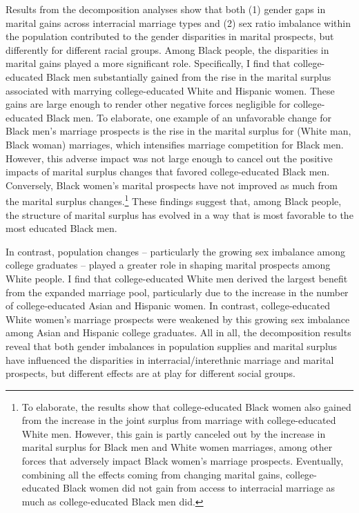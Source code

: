 Results from the decomposition analyses show that both (1) gender gaps in marital gains across interracial marriage types and (2) sex ratio imbalance within the population contributed to the gender disparities in marital prospects, but differently for different racial groups. Among Black people, the disparities in marital gains played a more significant role. Specifically, I find that college-educated Black men substantially gained from the rise in the marital surplus associated with marrying college-educated White and Hispanic women. These gains are large enough to render other negative forces negligible for college-educated Black men. To elaborate, one example of an unfavorable change for Black men's marriage prospects is the rise in the marital surplus for (White man, Black woman) marriages, which intensifies marriage competition for Black men. However, this adverse impact was not large enough to cancel out the positive impacts of marital surplus changes that favored college-educated Black men. Conversely, Black women's marital prospects have not improved as much from the marital surplus changes.\footnote{To elaborate, the results show that college-educated Black women also gained from the increase in the joint surplus from marriage with college-educated White men. However, this gain is partly canceled out by the increase in marital surplus for Black men and White women marriages, among other forces that adversely impact Black women's marriage prospects. Eventually, combining all the effects coming from changing marital gains, college-educated Black women did not gain from access to interracial marriage as much as college-educated Black men did.} These findings suggest that, among Black people, the structure of marital surplus has evolved in a way that is most favorable to the most educated Black men.


In contrast, population changes -- particularly the growing sex imbalance among college graduates -- played a greater role in shaping marital prospects among White people. I find that college-educated White men derived the largest benefit from the expanded marriage pool, particularly due to the increase in the number of college-educated Asian and Hispanic women. In contrast, college-educated White women's marriage prospects were weakened by this growing sex imbalance among Asian and Hispanic college graduates. All in all, the decomposition results reveal that both gender imbalances in population supplies and marital surplus have influenced the disparities in interracial/interethnic marriage and marital prospects, but different effects are at play for different social groups.  


